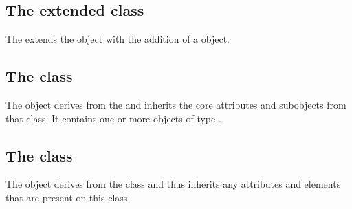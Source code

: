 \subsection{The extended  class}
\label{species-class}




The \FooPackage extends the  object with the addition of
a \ListOfBananas object.

\subsection{The  class}
\label{listofbananas-class}


The \ListOfBananas object derives from the  and inherits
the core attributes and subobjects from that class. It contains one or
more objects of type \Banana.

\subsection{The  class}
\label{banana-class}




The \Banana object derives from the \SBase class and thus inherits any
attributes and elements that are present on this class.
